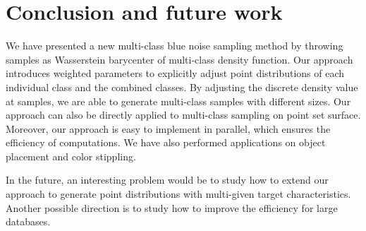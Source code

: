 \section{Conclusion and future work}
We have presented a new multi-class blue noise sampling method by
throwing samples as  Wasserstein barycenter of multi-class density function.
Our approach introduces weighted parameters to explicitly adjust point distributions of each individual class and the combined classes.
By adjusting the discrete density value at samples,
we are able to generate multi-class samples with different sizes.
Our approach can also be directly applied to multi-class sampling on point set surface.
Moreover, our approach is easy to implement in parallel, which ensures the efficiency of computations.
We have also performed applications on object placement and color stippling.

In the future,
an interesting problem would be to study how to extend our approach to generate point distributions with multi-given target characteristics.
Another possible direction is to study how to improve the efficiency for large databases.
